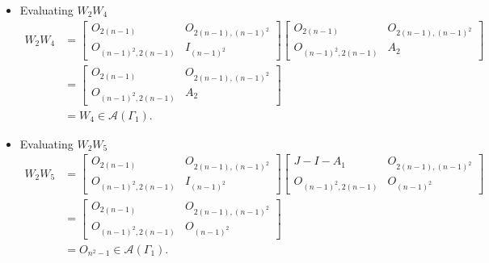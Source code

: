 \begin{itemize}
    \item Evaluating $W_2W_4$
    \begin{align*}
        W_2W_4
        &= \begin{bmatrix}
            O_{2(n-1)} & O_{2(n-1), (n-1)^2} \\
            O_{(n-1)^2, 2(n-1)} & I_{(n-1)^2}
        \end{bmatrix}\begin{bmatrix}
            O_{2(n-1)} & O_{2(n-1), (n-1)^2} \\
            O_{(n-1)^2, 2(n-1)} & A_2
        \end{bmatrix} \\
        &= \begin{bmatrix}
            O_{2(n-1)} & O_{2(n-1), (n-1)^2} \\
            O_{(n-1)^2, 2(n-1)} & A_2
        \end{bmatrix} \\
        &= W_4\in\mathcal{A}(\Gamma_1).
    \end{align*}
    
    \item Evaluating $W_2W_5$
    \begin{align*}
        W_2W_5
        &= \begin{bmatrix}
            O_{2(n-1)} & O_{2(n-1), (n-1)^2} \\
            O_{(n-1)^2, 2(n-1)} & I_{(n-1)^2}
        \end{bmatrix}\begin{bmatrix}
            J-I-A_1 & O_{2(n-1), (n-1)^2} \\
            O_{(n-1)^2, 2(n-1)} & O_{(n-1)^2}
        \end{bmatrix} \\
        &= \begin{bmatrix}
            O_{2(n-1)} & O_{2(n-1), (n-1)^2} \\
            O_{(n-1)^2, 2(n-1)} & O_{(n-1)^2}
        \end{bmatrix} \\
        &= O_{n^2-1}\in\mathcal{A}(\Gamma_1).
    \end{align*}
    

\end{itemize}
